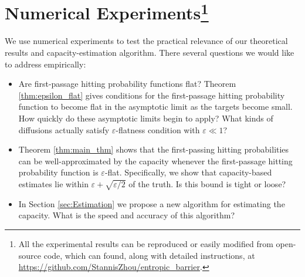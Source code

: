 \documentclass[12pt, nofootinbib,english, amsmath, amssymb, aps, priprint, graphicx,floatfix,draft]{revtex4-1}
\newcommand{\theepsrate}{\varepsilon + \sqrt{\varepsilon/2}}
\theoremstyle{plain}
\theoremstyle{definition}
\theoremstyle{plain}
\begin{document}

                                                                               


\section{Numerical Experiments\footnote{All the experimental results can be reproduced or easily modified from open-source code, which can found, along with detailed instructions, at \url{https://github.com/StannisZhou/entropic_barrier}.}}\label{sec:Experiments}
We use numerical experiments to test the practical relevance of our theoretical results and capacity-estimation algorithm.  There several questions we would like to address empirically:

\begin{itemize}
    \item Are first-passage hitting probability functions flat?  Theorem \ref{thm:epsilon_flat} gives conditions for the first-passage hitting probability function to become flat in the asymptotic limit as the targets become small.  How quickly do these asymptotic limits begin to apply?  What kinds of diffusions actually satisfy $\varepsilon$-flatness condition with $\varepsilon \ll 1$?
	\item Theorem \ref{thm:main_thm} shows that the first-passing hitting probabilities can be well-approximated by the capacity whenever the first-passage hitting probability function is $\varepsilon$-flat.  Specifically, we show that capacity-based estimates lie within $\theepsrate$ of the truth.  Is this bound is tight or loose?
	\item In Section \ref{sec:Estimation} we propose a new algorithm for estimating the capacity.  What is the speed and accuracy of this algorithm?
\end{itemize}
\end{document}
